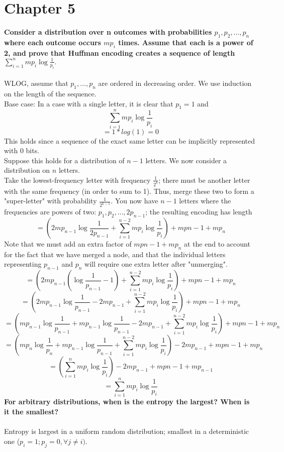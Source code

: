 \section{Chapter 5}
 
\begin{problem}{5.16}
\textbf{Consider a distribution over n outcomes with probabilities $p_1, p_2, ..., p_n$ where each outcome occurs $mp_i$ times. Assume that each is a power of 2, and prove that Huffman encoding creates a sequence of length $\sum_{i=1}^{n}mp_i \log \frac{1}{p_i}.$}
\\
\\
WLOG, assume that $p_1, ..., p_n$ are ordered in decreasing order. We use induction on the length of the sequence.
\\
Base case: In a case with a single letter, it is clear that $p_1 = 1$ and 
\[
    \sum_{i=1}^{n}mp_i \log \frac{1}{p_i}
\]
\[
    = 1 * log(1) = 0
\]
This holds since a sequence of the exact same letter can be implicitly represented with 0 bits.
\\
Suppose this holds for a distribution of $n - 1$ letters. We now consider a distribution on $n$ letters.
\\
Take the lowest-frequency letter with frequency $\frac{1}{2^{k}}$; there must be another letter with the same frequency (in order to sum to 1). Thus, merge these two to form a "super-letter" with probability $\frac{1}{2^{k - 1}}$. You now have $n - 1$ letters where the frequencies are powers of two: $p_1, p_2, ..., 2p_{n - 1}$; the resulting encoding has length 
\[
    = (2mp_{n - 1} \log \frac{1}{2p_{n - 1}} + \sum_{i=1}^{n - 2}mp_i \log \frac{1}{p_i}) + mp{n - 1} + mp_{n}
\]
Note that we must add an extra factor of $mp{n - 1} + mp_{n}$ at the end to account for the fact that we have merged a node, and that the individual letters representing $p_{n - 1}$ and $p_n$ will require one extra letter after "unmerging".
\[
    = (2mp_{n - 1} (\log \frac{1}{p_{n - 1}} - 1) + \sum_{i=1}^{n - 2}mp_i \log \frac{1}{p_i}) + mp{n - 1} + mp_{n}
\]
\[
    = (2mp_{n - 1} \log \frac{1}{p_{n - 1}} - 2mp_{n - 1} + \sum_{i=1}^{n - 2}mp_i \log \frac{1}{p_i}) + mp{n - 1} + mp_{n}
\]
\[
    = (mp_{n - 1} \log \frac{1}{p_{n - 1}} + mp_{n - 1} \log \frac{1}{p_{n - 1}} - 2mp_{n - 1} + \sum_{i=1}^{n - 2}mp_i \log \frac{1}{p_i}) + mp{n - 1} + mp_{n}
\]
\[
    = (mp_n \log \frac{1}{p_n} + mp_{n - 1} \log \frac{1}{p_{n - 1}} + \sum_{i=1}^{n - 2}mp_i \log \frac{1}{p_i}) - 2mp_{n - 1} + mp{n - 1} + mp_{n}
\]
\[
    = (\sum_{i=1}^{n}mp_i \log \frac{1}{p_i}) - 2mp_{n - 1} + mp{n - 1} + mp_{n - 1}
\]
\[
    = \sum_{i=1}^{n}mp_i \log \frac{1}{p_i}
\]
\textbf{For arbitrary distributions, when is the entropy the largest? When is it the smallest?}
\\
\\
Entropy is largest in a uniform random distribution; smallest in a deterministic one ($p_i = 1; p_j = 0, \forall j \neq i)$.
\end{problem}

